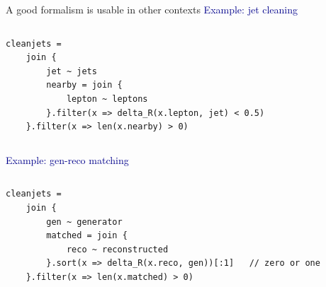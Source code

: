 \documentclass[aspectratio=169]{beamer}
\begin{document}
\begin{frame}[fragile]{A good formalism is usable in other contexts}
\small
\vspace{0.35 cm}
\textcolor{darkblue}{\large Example: jet cleaning}

\vspace{-0.25 cm}
\begin{columns}
\begin{verbatim}
cleanjets =
    join {
        jet ~ jets
        nearby = join {
            lepton ~ leptons
        }.filter(x => delta_R(x.lepton, jet) < 0.5)
    }.filter(x => len(x.nearby) > 0)
\end{verbatim}
\end{columns}

\vspace{0.5 cm}
\textcolor{darkblue}{\large Example: gen-reco matching}

\vspace{-0.25 cm}
\begin{columns}
\begin{verbatim}
cleanjets =
    join {
        gen ~ generator
        matched = join {
            reco ~ reconstructed
        }.sort(x => delta_R(x.reco, gen))[:1]   // zero or one
    }.filter(x => len(x.matched) > 0)
\end{verbatim}
\end{columns}
\end{frame}
\end{document}
